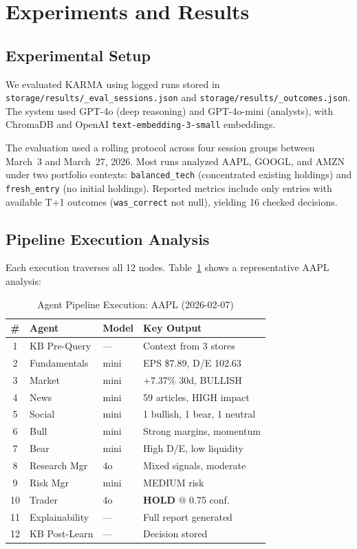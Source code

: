 \documentclass[conference]{IEEEtran}
\begin{document}
\section{Experiments and Results}

\subsection{Experimental Setup}

We evaluated KARMA using logged runs stored in \texttt{storage/results/\_eval\_sessions.json} and \texttt{storage/results/\_outcomes.json}. The system used GPT-4o (deep reasoning) and GPT-4o-mini (analysts), with ChromaDB and OpenAI \texttt{text-embedding-3-small} embeddings.

The evaluation used a rolling protocol across four session groups between March~3 and March~27, 2026. Most runs analyzed AAPL, GOOGL, and AMZN under two portfolio contexts: \texttt{balanced\_tech} (concentrated existing holdings) and \texttt{fresh\_entry} (no initial holdings). Reported metrics include only entries with available T+1 outcomes (\texttt{was\_correct} not null), yielding 16 checked decisions.

\subsection{Pipeline Execution Analysis}

Each execution traverses all 12 nodes. Table~\ref{tab:pipeline} shows a representative AAPL analysis:

\begin{table}[htbp]
\caption{Agent Pipeline Execution: AAPL (2026-02-07)}
\label{tab:pipeline}
\centering
\footnotesize
\begin{tabular}{@{}clll@{}}
\toprule
\textbf{\#} & \textbf{Agent} & \textbf{Model} & \textbf{Key Output} \\
\midrule
1 & KB Pre-Query & --- & Context from 3 stores \\
2 & Fundamentals & mini & EPS \$7.89, D/E 102.63 \\
3 & Market & mini & +7.37\% 30d, BULLISH \\
4 & News & mini & 59 articles, HIGH impact \\
5 & Social & mini & 1 bullish, 1 bear, 1 neutral \\
6 & Bull & mini & Strong margins, momentum \\
7 & Bear & mini & High D/E, low liquidity \\
8 & Research Mgr & 4o & Mixed signals, moderate \\
9 & Risk Mgr & mini & MEDIUM risk \\
10 & Trader & 4o & \textbf{HOLD} @ 0.75 conf. \\
11 & Explainability & --- & Full report generated \\
12 & KB Post-Learn & --- & Decision stored \\
\bottomrule
\end{tabular}
\end{table}
\end{document}
